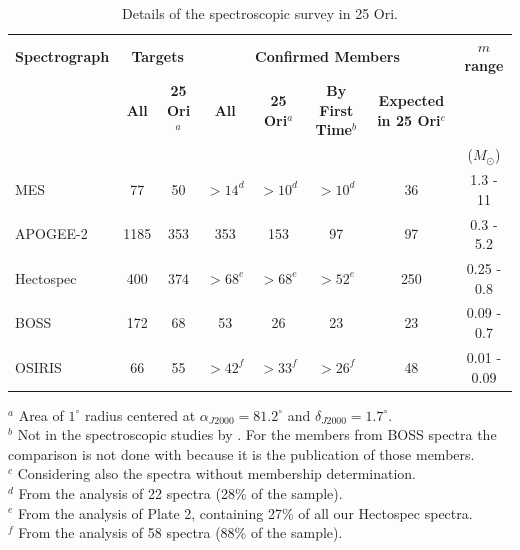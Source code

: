 \documentclass[12pt]{article}
\begin{document}
\begin{table} \scriptsize
\begin{center}
 \caption{Details of the spectroscopic survey in 25 Ori.}
 \label{tab:all_spectra}
 \begin{threeparttable}
  	\setlength{\tabcolsep}{10pt}
	\begin{tabular}{@{\extracolsep{2pt}}lccccccc@{}}
	\toprule
	{\bf Spectrograph} & \multicolumn{2}{c}{{\bf Targets}} & \multicolumn{4}{c}{{\bf Confirmed Members}}            & {\bf $m$ range} \\
	\cline{2-3}
	\cline{4-7}
	                   & {\bf All} & {\bf 25 Ori$^a$}      & {\bf All} & {\bf 25 Ori$^a$} & {\bf By First Time$^b$} & {\bf Expected in 25 Ori$^c$} &                 \\
	                   &           &                       &           &                  &                         &                              & ($M_\odot$)     \\
	\midrule
	MES          & 77   & 50  & $>14^d$ & $>10^d$ & $>10^d$ & 36  & 1.3  - 11 \\
	APOGEE-2     & 1185 & 353 & 353     & 153     & 97      & 97  & 0.3  - 5.2  \\ 
	Hectospec    & 400  & 374 & $>68^e$ & $>68^e$ & $>52^e$ & 250 & 0.25 - 0.8  \\
	BOSS         & 172  & 68  & 53      & 26      & 23      & 23  & 0.09 - 0.7  \\
	OSIRIS       & 66   & 55  & $>42^f$ & $>33^f$ & $>26^f$ & 48  & 0.01 - 0.09  \\
	\bottomrule
	\end{tabular}
	\begin{tablenotes}
	  $^a$ Area of $1^\circ$ radius \citep{Briceno2005,Briceno2007} centered at $\alpha_{J2000}=81.2^\circ$ and $\delta_{J2000}=1.7^\circ$. \\
	  $^b$ Not in the spectroscopic studies by \citet{Briceno2005,Briceno2007,Downes2014,Downes2015,Suarez2017,Briceno2018}. For the members from BOSS spectra the comparison is not done with \citet{Suarez2017} because it is the publication of those members. \\
	  $^c$ Considering also the spectra without membership determination. \\
	  $^d$ From the analysis of 22 spectra (28\% of the sample). \\
	  $^e$ From the analysis of Plate 2, containing 27\% of all our Hectospec spectra. \\
	  $^f$ From the analysis of 58 spectra (88\% of the sample). \\
	\end{tablenotes}
 \end{threeparttable}
\end{center}
\end{table}
\end{document}
